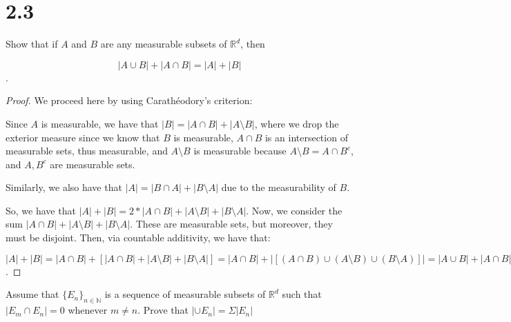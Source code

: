 \documentclass[10pt]{article}
\newenvironment{problem}[2][Problem]{\begin{trivlist}
\item[\hskip \labelsep {\bfseries #1}\hskip \labelsep {\bfseries #2.}]}{\end{trivlist}}
\begin{document}
\section*{2.3}

\begin{problem}{2.2.32}
Show that if $A$ and $B$ are any measurable subsets of $\mathbb{R}^d$, then

$$ | A \cup B | + | A \cap B | = |A| + |B| $$.
\end{problem}

\begin{proof}[Proof]
We proceed here by using Carath\'eodory's criterion:

Since $A$ is measurable, we have that $|B| = |A \cap B| + | A \setminus B |$, where we drop the exterior measure since we know that $B$ is measurable, $A \cap B$ is an intersection of measurable sets, thus measurable, and $A \setminus B$ is measurable because  $A \setminus B = A \cap B^c$, and $A, B^c$ are measurable sets.

Similarly, we also have that $|A| = |B \cap A| + |B \setminus A|$ due to the measurability of $B$.

So, we have that $|A| + |B| = 2 * |A \cap B | + |A \setminus B | + |B \setminus A|$. Now, we consider the sum $|A \cap B| + |A \setminus B| + |B \setminus A|$. These are measurable sets, but moreover, they must be disjoint. Then, via countable additivity, we have that:

 $$|A| + |B| = |A \cap B | + [| A \cap B | + |A \setminus B | + |B \setminus A|] = |A \cap B| + | [ (A \cap B) \cup (A \setminus B) \cup (B \setminus A)] | = | A \cup B | + | A \cap B | $$.
\end{proof}

\begin{problem}{2.2.33}
Assume that $\{E_n\}_{n \in \mathbb{N}}$ is a sequence of measurable subsets of $\mathbb{R}^d$ such that $|E_m \cap E_n| = 0$ whenever $m \not = n$. Prove that $|\cup E_n| = \Sigma | E_n | $
\end{problem}
\end{document}

